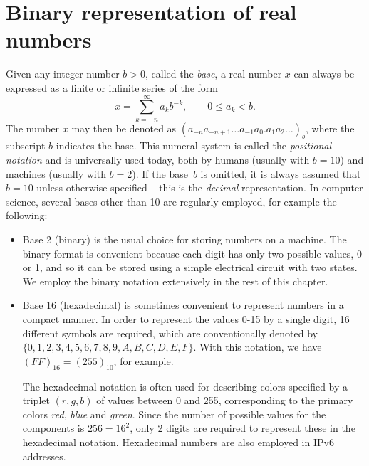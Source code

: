 \section{Binary representation of real numbers}%
\label{sec:binary_representation_of_real_numbers}

Given any integer number $b > 0$, called the \emph{base},
a real number $x$ can always be expressed as a finite or infinite series of the form
\[
    x = \sum_{k=-n}^{\infty} a_k b^{-k}, \qquad 0 \leq a_k < b.
\]
The number $x$ may then be denoted as $(a_{-n} a_{-n+1}\dots a_{-1} a_{0}.a_{1} a_{2} \dots)_{b}$,
where the subscript $b$ indicates the base.
This numeral system is called the \emph{positional notation} and is universally used today,
both by humans (usually with $b=10$) and machines (usually with $b=2$).
If the base~$b$ is omitted,
it is always assumed that $b = 10$ unless otherwise specified
-- this is the \emph{decimal} representation.
In computer science, several bases other than 10 are regularly employed,
for example the following:
\begin{itemize}
    \item
        Base 2 (binary) is the usual choice for storing numbers on a machine.
        The binary format is convenient because each digit has only two possible values, 0 or 1,
        and so it can be stored using a simple electrical circuit with two states.
        We employ the binary notation extensively in the rest of this chapter.

    \item
        Base 16 (hexadecimal) is sometimes convenient to represent numbers in a compact manner.
        In order to represent the values 0-15 by a single digit,
        16 different symbols are required, which are conventionally denoted by $\{0,1,2,3,4,5,6,7,8,9,A,B,C,D,E,F\}$.
        With this notation, we have $(FF)_{16} = (255)_{10}$, for example.

        The hexadecimal notation is often used for describing colors specified by a triplet $(r,g,b)$ of values between 0 and 255,
        corresponding to the primary colors \emph{red}, \emph{blue} and \emph{green}.
        Since the number of possible values for the components is $256 = 16^2$,
        only 2 digits are required to represent these in the hexadecimal notation.
        Hexadecimal numbers are also employed in IPv6 addresses.
\end{itemize}



